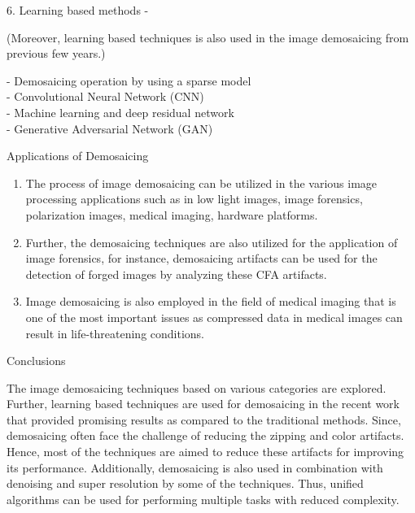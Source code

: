 \documentclass[final]{beamer}
\newlength{\colwidth}
\begin{document}
\begin{frame}[t]
\begin{columns}[t]
\begin{column}{\colwidth}
\par 6.  Learning based methods -
\par (Moreover, learning based techniques is also used in the image demosaicing from previous few years.)
\par - Demosaicing operation by using a sparse model \\ - Convolutional Neural Network (CNN) \\ - Machine learning and deep residual network \\ - Generative Adversarial Network (GAN) 
\vspace{1cm}
 \begin{block}{Applications of Demosaicing}
\begin{enumerate}
    \item The process of image demosaicing can be utilized in the various image processing applications such as in low light images, image forensics, polarization images, medical imaging, hardware platforms.
    \item Further, the demosaicing techniques are also utilized for the application of image forensics, for instance,
demosaicing artifacts can be used for the detection of forged images by analyzing these CFA artifacts.
\item Image demosaicing is also employed in the field of medical imaging that is one of the most important
issues as compressed data in medical images can result in life-threatening conditions. 
\end{enumerate}





  \end{block}
  

\begin{block}{Conclusions}
\par The image demosaicing techniques based on various categories are explored. Further, learning based techniques are used for demosaicing in the recent work that provided promising results as compared to the traditional methods. Since, demosaicing often face the challenge of reducing the zipping and color artifacts. Hence, most of the techniques are aimed to reduce these artifacts for improving its performance. Additionally, demosaicing is also used in combination with denoising and super resolution by some of the techniques. Thus, unified algorithms can be used for performing multiple tasks with reduced complexity. 

\end{block}


\end{column}
\end{columns}
\end{frame}
\end{document}
